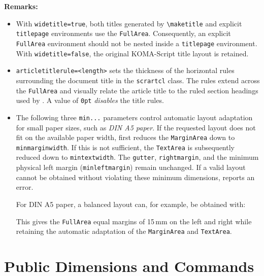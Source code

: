 \documentclass[
11pt,
a4paper,
oneside
]{scrbook}
\begin{document}
\noindent\textbf{Remarks:}
\begin{itemize}
	\item  With \texttt{widetitle=true}, both titles generated by 
	\texttt{\textbackslash{}maketitle} and explicit \texttt{titlepage}
	environments use the \texttt{FullArea}. Consequently, an explicit
	\texttt{FullArea} environment should not be nested inside a
	\texttt{titlepage} environment.
	With \texttt{widetitle=false}, the original KOMA-Script title layout
	is retained.
	
	\item \texttt{articletitlerule=<length>} sets the thickness of the horizontal 
	rules surrounding the document 	title in the \texttt{scrartcl} class.
	The rules extend across the \texttt{FullArea} and visually relate the 
	article title to the ruled section headings used by \MDWordmark.
	A value of \texttt{0pt} \emph{disables} the title rules.
	
	\item The following three \texttt{min...} parameters control automatic
	layout adaptation for small paper sizes, such as \emph{DIN A5 paper}.
	If the requested layout does not fit on the available paper width,
	\MDWordmark first reduces the \texttt{MarginArea} down to
	\texttt{minmarginwidth}. If this is not sufficient, the
	\texttt{TextArea} is subsequently reduced down to
	\texttt{mintextwidth}. The \texttt{gutter}, \texttt{rightmargin}, and
	the minimum physical left margin (\texttt{minleftmargin}) remain unchanged.
	If a valid layout cannot be obtained without violating these minimum
	dimensions, \MDWordmark reports an error.
	
	For DIN A5 paper, a balanced layout can, for example, be obtained with:




	This gives the \texttt{FullArea} equal margins of 15\,mm on
	the left and right while retaining the automatic adaptation of the
	\texttt{MarginArea} and \texttt{TextArea}.
	
\end{itemize}



\chapter{Public Dimensions and Commands}
\label{chap:public-api}
\end{document}
